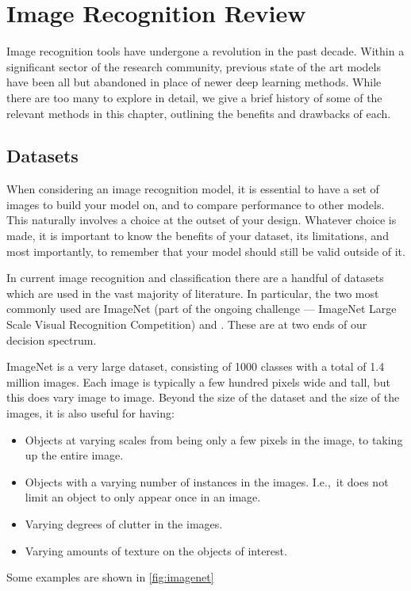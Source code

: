\chapter{Image Recognition Review}\label{ch:litreview}
  Image recognition tools have undergone a revolution in the past decade.
  Within a significant sector of the research community, previous 
  state of the art models have been all but abandoned in place of newer
  deep learning methods. While there are too many to explore in detail, we give 
  a brief history of some of the relevant methods in this
  chapter, outlining the benefits and drawbacks of each. 



\section{Datasets}\label{sec:datasets}
  When considering an image recognition model, it is essential to have a set of
  images to build your model on, and to compare performance to other models.
  This naturally involves a choice at the outset of your design.  Whatever
  choice is made, it is important to know the benefits of your dataset, its
  limitations, and most importantly, to remember that your model should still
  be valid outside of it.

  In current image recognition and classification there are a handful of
  datasets which are used in the vast majority of literature. In particular,
  the two most commonly used are ImageNet \citep{russakovsky_imagenet_2015}
  (part of the ongoing challenge --- ImageNet Large Scale Visual Recognition
  Competition) and \cifar\citep{krizhevsky_learning_2009}. These are at two
  ends of our decision spectrum. 
  
  ImageNet is a very large dataset, consisting of 1000 classes with a total of
  1.4 million images. Each image is typically a few hundred pixels wide and
  tall, but this does vary image to image. Beyond the size of the dataset and
  the size of the images, it is also useful for having:
  
  \begin{itemize}
    \item Objects at varying scales from being only a few pixels in the image,
      to taking up the entire image.
    \item Objects with a varying number of instances in the images. I.e.,\ it
      does not limit an object to only appear once in an image.
    \item Varying degrees of clutter in the images.
    \item Varying amounts of texture on the objects of interest.
  \end{itemize}
  Some examples are shown in \autoref{fig:imagenet}

